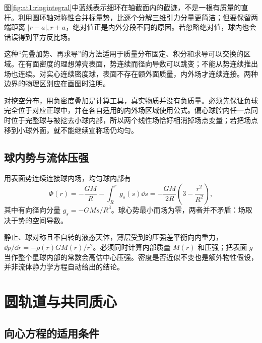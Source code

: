 
  图\ref{fig:at1:ringintegral}中蓝线表示细环在轴截面内的截迹，不是一根有质量的直杆。利用圆环轴对称性合并标量势，比逐个分解三维引力分量更简洁；但要保留两端距离 $|r-a|,r+a$，绝对值正是内外分段不同的原因。若忽略绝对值，球内也会错误得到平方反比场。

  这种“先叠加势、再求导”的方法适用于质量分布固定、积分和求导可以交换的区域。在有面密度的理想薄壳表面，势连续而径向导数可以跳变；不能从势连续推出场也连续。对实心连续密度球，表面不存在额外面质量，内外场才连续连接。两种边界的物理区别应在画图时注明。

  对挖空分布，用负密度叠加是计算工具，真实物质并没有负质量。必须先保证负球完全位于对应正球中，并在各自适用的内外场区域使用公式。偏心球腔内任一点同时位于完整球与被挖去小球内部，所以两个线性场恰好相消掉场点变量；若把场点移到小球外面，就不能继续宣称场仍均匀。
  \subsection{球内势与流体压强}

用表面势连续连接球内场，均匀球内部有
\[
 \Phi(r)=-\frac{GM}{R}-\int_R^r g_s(s)\dd s
 =-\frac{GM}{2R}\left(3-\frac{r^2}{R^2}\right),
\]
其中有向径向分量 $g_s=-GMs/R^3$。球心势最小而场为零，两者并不矛盾：场取决于势的空间导数。

静止、球对称且不自转的液态天体，薄层受到的压强差平衡向内重力，$\dd p/\dd r=-\rho(r)GM(r)/r^2$。必须同时计算内部质量 $M(r)$ 和压强；把表面 $g$ 当作整个星球内部的常数会高估中心压强。密度是否近似不变也是额外物性假设，并非流体静力学方程自动给出的结论。


\section{圆轨道与共同质心}
\subsection{向心方程的适用条件}

